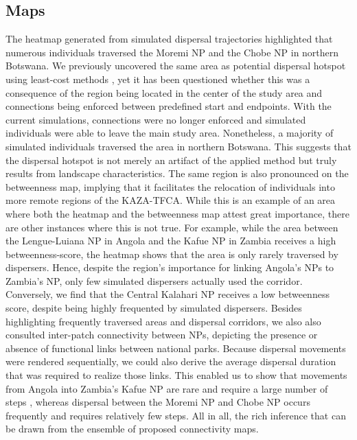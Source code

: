 \documentclass[abstract=on,10pt,a4paper,bibliography=totocnumbered]{article}
\begin{document}
\subsection{Maps}
The heatmap generated from simulated dispersal trajectories highlighted that
numerous individuals traversed the Moremi NP and the Chobe NP in northern
Botswana. We previously uncovered the same area as potential dispersal hotspot
using least-cost methods \citep{Hofmann.2021}, yet it has been questioned
whether this was a consequence of the region being located in the center of the
study area and connections being enforced between predefined start and
endpoints. With the current simulations, connections were no longer enforced and
simulated individuals were able to leave the main study area. Nonetheless, a
majority of simulated individuals traversed the area in northern Botswana. This
suggests that the dispersal hotspot is not merely an artifact of the applied
method but truly results from landscape characteristics. The same region is also
pronounced on the betweenness map, implying that it facilitates the relocation
of individuals into more remote regions of the KAZA-TFCA. While this is an
example of an area where both the heatmap and the betweenness map attest great
importance, there are other instances where this is not true. For example, while
the area between the Lengue-Luiana NP in Angola and the Kafue NP in Zambia
receives a high betweenness-score, the heatmap shows that the area is only
rarely traversed by dispersers. Hence, despite the region's importance for
linking Angola's NPs to Zambia's NP, only few simulated dispersers actually used
the corridor. Conversely, we find that the Central Kalahari NP receives a low
betweenness score, despite being highly frequented by simulated dispersers.
Besides highlighting frequently traversed areas and dispersal corridors, we also
also consulted inter-patch connectivity between NPs, depicting the presence or
absence of functional links between national parks. Because dispersal movements
were rendered sequentially, we could also derive the average dispersal duration
that was required to realize those links. This enabled us to show that movements
from Angola into Zambia's Kafue NP are rare and require a large number of steps
, whereas dispersal between the Moremi NP and Chobe NP occurs frequently and
requires relatively few steps. All in all, the rich inference that can be drawn
from the ensemble of proposed connectivity maps.

\end{document}
